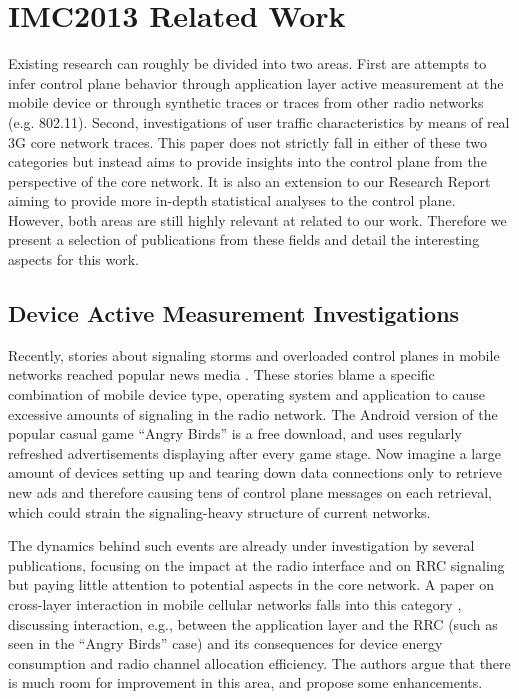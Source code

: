 \section{IMC2013 Related Work}

Existing research can roughly be divided into two areas. First are attempts to infer control plane behavior through application layer active measurement at the mobile device or through synthetic traces or traces from other radio networks (e.g. 802.11).
Second, investigations of user traffic characteristics by means of real 3G core network traces.
This paper does not strictly fall in either of these two categories but instead aims to provide insights into the control plane from the perspective of the core network. It is also an extension to our Research Report\cite{metzger2012research} aiming to provide more in-depth statistical analyses to the control plane.  
However, both areas are still highly relevant at related to our work. Therefore we present a selection of publications from these fields and detail the interesting aspects for this work.

\subsection{Device Active Measurement Investigations}

Recently, stories about signaling storms and overloaded control planes in mobile networks reached popular news media \cite{it2011birdandroid, lt2012docostorm}. These stories blame a specific combination of mobile device type, operating system and application to cause excessive amounts of signaling in the radio network. The Android version of the popular casual game ``Angry Birds'' is a free download, and uses regularly refreshed advertisements displaying after every game stage. Now imagine a large amount of devices setting up and tearing down data connections only to retrieve new ads and therefore causing tens of control plane messages on each retrieval, which could strain the signaling-heavy structure of current networks. 

The dynamics behind such events are already under investigation by several publications, focusing on the impact at the radio interface and on \ac{RRC} signaling but paying little attention to potential aspects in the core network. A paper on cross-layer interaction in mobile cellular networks falls into this category \cite{qian2011profiling}, discussing interaction, e.g., between the application layer and the \ac{RRC} (such as seen in the ``Angry Birds'' case) and its consequences for device energy consumption and radio channel allocation efficiency. The authors argue that there is much room for improvement in this area, and propose some enhancements.


